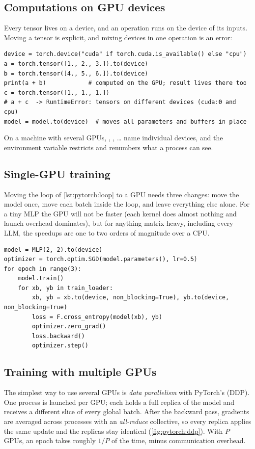 \subsection{Computations on GPU devices}
Every tensor lives on a device, and an operation runs on the device of its inputs. Moving a tensor is
explicit, and mixing devices in one operation is an error:

\begin{lstlisting}[caption={Device placement rules.},label={lst:pytorch:device}]
device = torch.device("cuda" if torch.cuda.is_available() else "cpu")
a = torch.tensor([1., 2., 3.]).to(device)
b = torch.tensor([4., 5., 6.]).to(device)
print(a + b)            # computed on the GPU; result lives there too
c = torch.tensor([1., 1., 1.])
# a + c  -> RuntimeError: tensors on different devices (cuda:0 and cpu)
model = model.to(device)  # moves all parameters and buffers in place
\end{lstlisting}

On a machine with several GPUs, , , \ldots{} name individual devices, and the
environment variable  restricts and renumbers what a process can see.

\subsection{Single-GPU training}
Moving the loop of \cref{lst:pytorch:loop} to a GPU needs three changes: move the model once, move each batch
inside the loop, and leave everything else alone. For a tiny MLP the GPU will not be faster (each kernel does
almost nothing and launch overhead dominates), but for anything matrix-heavy, including every LLM, the
speedups are one to two orders of magnitude over a CPU.

\begin{lstlisting}[caption={The training loop on a GPU.},label={lst:pytorch:gpuloop}]
model = MLP(2, 2).to(device)
optimizer = torch.optim.SGD(model.parameters(), lr=0.5)
for epoch in range(3):
    model.train()
    for xb, yb in train_loader:
        xb, yb = xb.to(device, non_blocking=True), yb.to(device, non_blocking=True)
        loss = F.cross_entropy(model(xb), yb)
        optimizer.zero_grad()
        loss.backward()
        optimizer.step()
\end{lstlisting}

\subsection{Training with multiple GPUs}\label{sec:pytorch:ddp}
The simplest way to use several GPUs is \emph{data parallelism} with PyTorch's
 (DDP). One process is launched per GPU; each holds a full replica of the model
and receives a different slice of every global batch. After the backward pass, gradients are averaged across
processes with an \emph{all-reduce} collective, so every replica applies the same update and the replicas stay
identical (\cref{fig:pytorch:ddp}). With $P$ GPUs, an epoch takes roughly $1/P$ of the time, minus
communication overhead.

